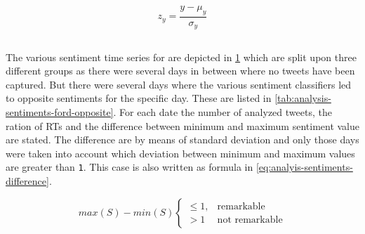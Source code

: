 \begin{equation}
    z_y = \frac{y - \mu_y}{\sigma_y}
    \label{eq:analysis-sentiments-normalization}
\end{equation}


\subsection{\ford}
\label{ss:analysis-sentiments-ford}

The various sentiment time series for \ford{} are depicted in \cref{fig:analysis-sentiments-ford} which are split upon three different groups as there were several days in between where no tweets have been captured.
But there were several days where the various sentiment classifiers led to opposite sentiments for the specific day.
These are listed in \cref{tab:analysis-sentiments-ford-opposite}.
For each date the number of analyzed tweets, the ration of \acp{RT} and the difference between minimum and maximum sentiment value are stated.
The difference are by means of standard deviation and only those days were taken into account which deviation between minimum and maximum values are greater than \texttt{1}.
This case is also written as formula in \cref{eq:analyis-sentiments-difference}.

\begin{equation}
    max(S)-min(S)
    \begin{cases}
		\leq 1, & \text{remarkable} \\
		> 1  & \text{not remarkable}
    \end{cases}
    \label{eq:analyis-sentiments-difference}
\end{equation}

\begin{figure}[hbt]
    \centering
    
    \caption{\sentimentsCaption{\ford}}
    \label{fig:analysis-sentiments-ford}
\end{figure} 


